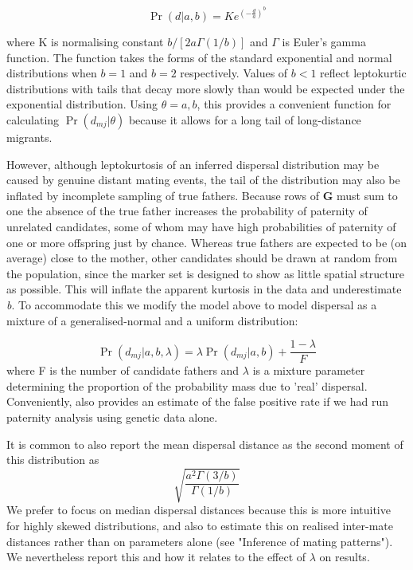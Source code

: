 \documentclass[10pt, a4paper, twocolumn]{article} %
\begin{document}
\begin{equation}
\Pr(d|a,b) =K e^{  (-\frac{d}{a} )^b }
\label{eqn:GND}
\end{equation}

where K is normalising constant $b/[2a\Gamma(1/b)]$ and $\Gamma$ is Euler's gamma function. The function takes the forms of the standard exponential and normal distributions when $b=1$ and $b=2$ respectively. Values of $b<1$ reflect leptokurtic distributions with tails that decay more slowly than would be expected under the exponential distribution. Using $\theta={a,b}$, this provides a convenient function for calculating $\Pr(d_{mj} | \theta)$ because it allows for a long tail of long-distance migrants.

However, although leptokurtosis of an inferred dispersal distribution may be caused by genuine distant mating events, the tail of the distribution may also be inflated by incomplete sampling of true fathers. Because rows of \textbf{G} must sum to one the absence of the true father increases the probability of paternity of unrelated candidates, some of whom may have high probabilities of paternity of one or more offspring just by chance. Whereas true fathers are expected to be (on average) close to the mother, other candidates should be drawn at random from the population, since the marker set is designed to show as little spatial structure as possible. This will inflate the apparent kurtosis in the data and underestimate \textit{b}. To accommodate this we modify the model above to model dispersal as a mixture of a generalised-normal and a uniform distribution:

\begin{equation}\label{eqn:mixture_model}
\Pr(d_{mj} | a,b,\lambda) = \lambda \Pr(d_{mj}|a,b) + \frac{1-\lambda}{F}
\end{equation}
where F is the number of candidate fathers and $\lambda$ is a mixture parameter determining the proportion of the probability mass due to ’real’ dispersal. Conveniently, also provides an estimate of the false positive rate if we had run paternity analysis using genetic data alone.

It is common to also report the mean dispersal distance as the second moment of this distribution as
\begin{equation}
\label{eqn:sd_GND}    
\sqrt{ \frac{ a^2 \Gamma(3/b) }{ \Gamma(1/b) } }
\end{equation}
We prefer to focus on median dispersal distances because this is more intuitive for highly skewed distributions, and also to estimate this on realised inter-mate distances rather than on parameters alone (see "Inference of mating patterns"). We nevertheless report this and how it relates to the effect of $\lambda$ on results.
\end{document}
